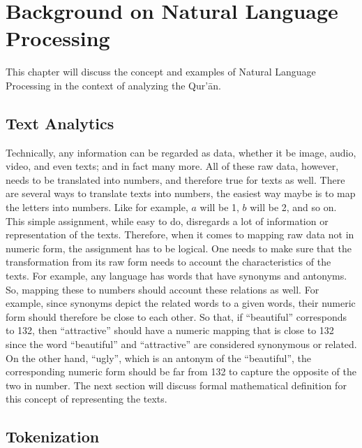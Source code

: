 
\chapter{Background on Natural Language Processing}
This chapter will discuss the concept and examples of Natural Language Processing in the context of analyzing the Qur'\=an.
\section{Text Analytics}
Technically, any information can be regarded as data, whether it be image, audio, video, and even texts; and in fact many more. All of these raw data, however, needs to be translated into numbers, and therefore true for texts as well. There are several ways to translate texts into numbers, the easiest way maybe is to map the letters into numbers. Like for example, $a$ will be 1, $b$ will be 2, and so on. This simple assignment, while easy to do, disregards a lot of information or representation of the texts. Therefore, when it comes to mapping raw data not in numeric form, the assignment has to be logical. One needs to make sure that the transformation from its raw form needs to account the characteristics of the texts. For example, any language has words that have synonyms and antonyms. So, mapping these to numbers should account these relations as well. For example, since synonyms depict the related words to a given words, their numeric form should therefore be close to each other. So that, if ``beautiful'' corresponds to 132, then ``attractive'' should have a numeric mapping that is close to 132 since the word ``beautiful'' and ``attractive'' are considered synonymous or related. On the other hand, ``ugly'', which is an antonym of the ``beautiful'', the corresponding numeric form should be far from 132 to capture the opposite of the two in number. The next section will discuss formal mathematical definition for this concept of representing the texts.
\section{Tokenization}\label{sec:text_tokenization}

